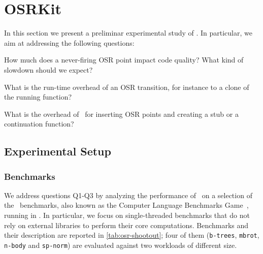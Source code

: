 \section{OSRKit}
\label{se:eval-osrkit}

In this section we present a preliminar experimental study of \osrkit. In particular, we aim at addressing the following questions:

\begin{description}[labelindent=1em ,labelsep*=1em,leftmargin=3.5em,itemsep=3pt,parsep=3pt]
\item[Q1] How much does a never-firing OSR point impact code quality? What kind of slowdown should we expect?
\item[Q2] What is the run-time overhead of an OSR transition, for instance to a clone of the running function?
\item[Q3] What is the overhead of \osrkit\ for inserting OSR points and creating a stub or a continuation function?
\end{description}

\missing


\subsection{Experimental Setup}

\subsubsection*{Benchmarks}
We address questions Q1-Q3 by analyzing the performance of \osrkit\ on a selection of the \shootout\ benchmarks, also known as the Computer Language Benchmarks Game~\cite{shootout}, running in \tinyvm. In particular, we focus on single-threaded benchmarks that do not rely on external libraries to perform their core computations. Benchmarks and their description are reported in \mytable\ref{tab:osr-shootout}; four of them ({\tt b-trees}, {\tt mbrot}, {\tt n-body} and {\tt sp-norm}) are evaluated against two workloads of different size.

